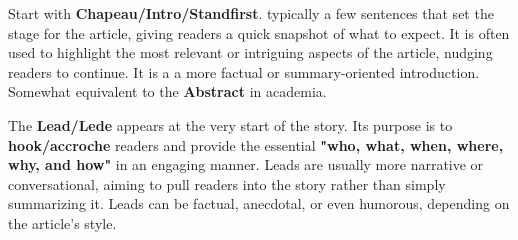 
Start with \textcolor{wrtxColorSuccess}{\textbf{Chapeau/Intro/Standfirst}}. typically a few sentences that set the stage for the article, giving readers a quick snapshot of what to expect. It is often used to highlight the most relevant or intriguing aspects of the article, nudging readers to continue. It is a  a more factual or summary-oriented introduction. Somewhat equivalent to the \textcolor{wrtxColorSuccess}{\textbf{Abstract}} in academia.


The \textcolor{wrtxColorSuccess}{\textbf{Lead/Lede}} appears at the very start of the story. Its purpose is to \textcolor{wrtxColorSuccess}{\textbf{hook/accroche}} readers and provide the essential \textbf{"who, what, when, where, why, and how"} in an engaging manner. Leads are usually more narrative or conversational, aiming to pull readers into the story rather than simply summarizing it. Leads can be factual, anecdotal, or even humorous, depending on the article's style.


\lipsum[1]

\lipsum[2]

\lipsum[3]
